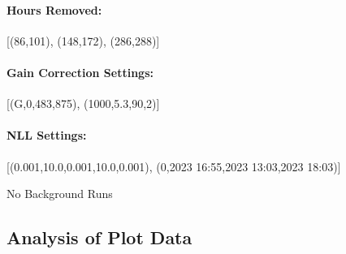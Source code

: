 \documentclass[letterpaper,12pt]{article}
\begin{document}
\paragraph{Hours Removed: }
[(86,101), (148,172), (286,288)]

\paragraph{Gain Correction Settings: }
[(G,0,483,875), (1000,5.3,90,2)]

\paragraph{NLL Settings:}
[(0.001,10.0,0.001,10.0,0.001), (0,2023 16:55,2023 13:03,2023 18:03)]

No Background Runs


\subsection*{Analysis of Plot Data}
\end{document}
